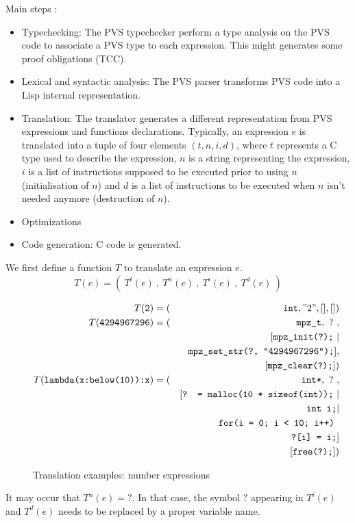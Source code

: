 \documentclass[12pt,a4paper,titlepage]{article}
\newcommand{\cl}[1]{\texttt{#1}}
\begin{document}
Main steps :
\begin{itemize}
\item Typechecking: The PVS typechecker perform a type analysis on the PVS code to associate a PVS type to each expression. This might generates some proof obligations (TCC).
\item Lexical and syntactic analysis: The PVS parser transforms PVS code into a Lisp internal representation.
\item Translation: The translator generates a different representation from PVS expressions and functions declarations.
Typically, an expression $e$ is translated into a tuple of four elements $(t,n,i,d)$, where $t$ represents a C type used to describe the expression, $n$ is a string representing the expression, $i$ is a list of instructions supposed to be executed prior to using $n$ (initialisation of $n$) and $d$ is a list of instructions to be executed when $n$ isn't needed anymore (destruction of $n$).
\item Optimizations
\item Code generation: C code is generated.
\end{itemize}

We first define a function $T$ to translate an expression $e$.
$$ T(e) = ( \ T^t(e) \ , \ T^n(e) \ , \ T^i(e) \ , \ T^d(e) \ ) $$

\begin{figure}[h!]
\begin{eqnarray*}
T(\cl{2}) &= (& \cl{int}, "2", [], []) \\
T(\cl{4294967296}) &= (& \cl{mpz\_t}, \ ? \ , \\
&& [ \cl{mpz\_init(?);} \ | \\
&& \ \cl{mpz\_set\_str(?, "4294967296");} ],\\
&& [ \cl{mpz\_clear(?);} ]) \\
T(\cl{lambda(x:below(10)):x}) &= (& \cl{int*}, \ ? \ , \\
&& [ \cl{? = malloc(10 * sizeof(int));} \ | \\
&& \ \cl{int i;} | \\
&& \ \cl{for(i = 0; i < 10; i++) }\\
&& \ \ \ \cl{?[i] = i;}  ]\\
&& [ \cl{free(?);} ])
\end{eqnarray*}
\caption{Translation examples: number expressions}
\end{figure}

It may occur that $T^n(e) = ?$. In that case, the symbol $?$ appearing in $T^i(e)$ and $T^d(e)$ needs to be replaced by a proper variable name.\\
\end{document}
